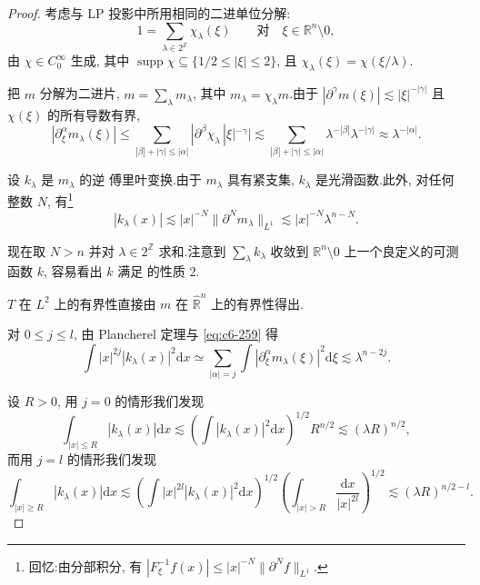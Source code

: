 \begin{proof}
考虑与 LP 投影中所用相同的二进单位分解:
\[
1 = \sum_{\lambda \in 2^{\mathbb{Z}}} \chi_\lambda(\xi) \qquad \text{对} \quad \xi \in \mathbb{R}^n \setminus 0,
\]
由 $\chi \in C_0^\infty$ 生成, 其中 $\operatorname{supp} \chi \subseteq \{1/2 \leq |\xi| \leq 2\}$, 且 $\chi_\lambda(\xi) = \chi(\xi/\lambda)$.

把 $m$ 分解为二进片, $m = \sum_\lambda m_\lambda$, 其中 $m_\lambda = \chi_\lambda m$.由于 $|\partial^\gamma m(\xi)| \lesssim |\xi|^{-|\gamma|}$ 且 $\chi(\xi)$ 的所有导数有界,
\begin{equation}
|\partial_\xi^\alpha m_\lambda(\xi)| \leq \sum_{|\beta| + |\gamma| \leq |\alpha|} |\partial^\beta \chi_\lambda\, |\xi|^{-\gamma}| \lesssim \sum_{|\beta| + |\gamma| \leq |\alpha|} \lambda^{-|\beta|} \lambda^{-|\gamma|} \approx \lambda^{-|\alpha|}.\label{eq:c6-259}
\end{equation}

设 $k_\lambda$ 是 $m_\lambda$ 的逆 傅里叶变换.由于 $m_\lambda$ 具有紧支集, $k_\lambda$ 是光滑函数.此外, 对任何整数 $N$, 有\footnote{回忆:由分部积分, 有 $|F_\xi^{-1} f(x)| \leq |x|^{-N} \|\partial^N f\|_{L^1}$.}
\[
|k_\lambda(x)| \lesssim |x|^{-N} \|\partial^N m_\lambda\|_{L^1} \lesssim |x|^{-N} \lambda^{n-N}.
\]

现在取 $N > n$ 并对 $\lambda \in 2^{\mathbb{Z}}$ 求和.注意到 $\sum_\lambda k_\lambda$ 收敛到 $\mathbb{R}^n \setminus 0$ 上一个良定义的可测函数 $k$, 容易看出 $k$ 满足 的性质 2.

$T$ 在 $L^2$ 上的有界性直接由 $m$ 在 $\widehat{\mathbb{R}}^n$ 上的有界性得出.

对 $0 \leq j \leq l$, 由 Plancherel 定理与 \eqref{eq:c6-259} 得
\[
\int |x|^{2j} |k_\lambda(x)|^2 \mathrm{d}x \simeq \sum_{|\alpha| = j} \int |\partial_\xi^\alpha m_\lambda(\xi)|^2 \mathrm{d}\xi \lesssim \lambda^{n-2j}.
\]

设 $R > 0$, 用 $j = 0$ 的情形我们发现
\begin{equation}
\int_{|x| \leq R} |k_\lambda(x)| \mathrm{d}x \lesssim \left(\int |k_\lambda(x)|^2 \mathrm{d}x\right)^{1/2} R^{n/2} \lesssim (\lambda R)^{n/2}, \label{eq:c6-260}
\end{equation}
而用 $j = l$ 的情形我们发现
\begin{equation}
\int_{|x| \geq R} |k_\lambda(x)| \mathrm{d}x \lesssim \left(\int |x|^{2l} |k_\lambda(x)|^2 \mathrm{d}x\right)^{1/2} \left(\int_{|x| > R} \frac{\mathrm{d}x}{|x|^{2l}}\right)^{1/2} \lesssim (\lambda R)^{n/2 - l}.\label{eq:c6-261}
\end{equation}


\end{proof}
